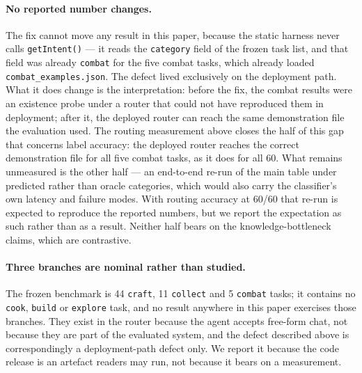 \documentclass[letterpaper]{article} %
\begin{document}
\paragraph{No reported number changes.}  The fix cannot move any result
in this paper, because the static harness never calls
\texttt{getIntent()} --- it reads the \texttt{category} field of the
frozen task list, and that field was already \texttt{combat} for the
five combat tasks, which already loaded
\texttt{combat\_examples.json}.  The defect lived exclusively on the
deployment path.  What it does change is the interpretation: before the
fix, the combat results were an existence probe under a router that
could not have reproduced them in deployment; after it, the deployed
router can reach the same demonstration file the evaluation used.  The
routing measurement above closes the half of this gap that concerns
label accuracy: the deployed router reaches the correct demonstration
file for all five combat tasks, as it does for all 60.  What remains
unmeasured is the other half --- an end-to-end re-run of the main table
under predicted rather than oracle categories, which would also carry
the classifier's own latency and failure modes.  With routing accuracy
at 60/60 that re-run is expected to reproduce the reported numbers, but
we report the expectation as such rather than as a result.  Neither half
bears on the knowledge-bottleneck claims, which are contrastive.

\paragraph{Three branches are nominal rather than studied.}  The frozen
benchmark is 44 \texttt{craft}, 11 \texttt{collect} and 5
\texttt{combat} tasks; it contains no \texttt{cook}, \texttt{build} or
\texttt{explore} task, and no result anywhere in this paper exercises
those branches.  They exist in the router because the agent accepts
free-form chat, not because they are part of the evaluated system, and
the defect described above is correspondingly a deployment-path defect
only.  We report it because the code release is an artefact readers may
run, not because it bears on a measurement.
\end{document}
